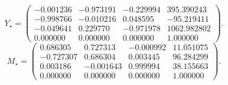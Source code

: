 \[Y_\star=\begin{pmatrix}-0.001236 & -0.973191 & -0.229994 & 395.390243 \\ -0.998766 & -0.010216 & 0.048595 & -95.219411 \\ -0.049641 & 0.229770 & -0.971978 & 1062.982802 \\ 0.000000 & 0.000000 & 0.000000 & 1.000000\end{pmatrix}.\]
\[M_\star=\begin{pmatrix}0.686305 & 0.727313 & -0.000992 & 11.051075 \\ -0.727307 & 0.686304 & 0.003445 & 96.284299 \\ 0.003186 & -0.001643 & 0.999994 & 38.155663 \\ 0.000000 & 0.000000 & 0.000000 & 1.000000\end{pmatrix}.\]
